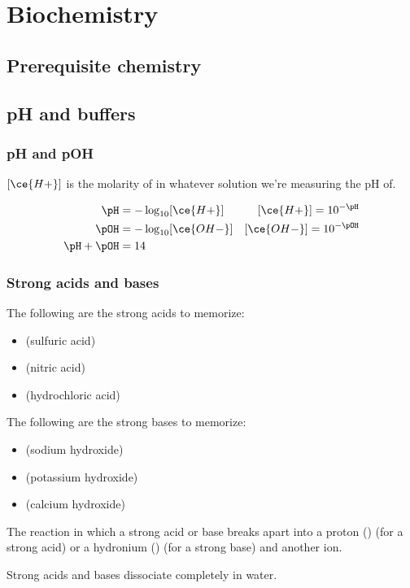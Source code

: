 \chapter{Biochemistry}

\section{Prerequisite chemistry}



\section{pH and buffers}

\subsection{pH and pOH}

$[\ce{H+}]$ is the molarity of  in whatever solution we're measuring the pH of.

\begin{align*}
  \pH &= - \log_{10} [\ce{H+}] & [\ce{H+}] = 10^{-\pH} \\
  \pOH &= - \log_{10} [\ce{OH-}] & [\ce{OH-}] = 10^{-\pOH} \\
  \pH + \pOH &= 14
\end{align*}

\subsection{Strong acids and bases}

The following are the strong acids to memorize:
\begin{itemize}
  \item {} (sulfuric acid)
  \item {} (nitric acid)
  \item {} (hydrochloric acid)
\end{itemize}

The following are the strong bases to memorize:
\begin{itemize}
  \item {} (sodium hydroxide)
  \item {} (potassium hydroxide)
  \item {} (calcium hydroxide)
\end{itemize}

\begin{definition}
  The reaction in which a strong acid or base breaks apart into a proton () (for a strong acid) or a hydronium () (for a strong base) and another ion.

  Strong acids and bases dissociate completely in water.
\end{definition}


